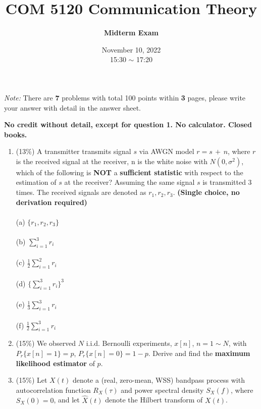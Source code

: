 \documentclass[a4paper,12pt]{article}
\title{\textbf{COM 5120 Communication Theory}}
\author{\textbf{Midterm Exam}}
\date{November 10, 2022 \\ 
15:30 $\sim$ 17:20
}
\begin{document}
    \maketitle
    \textit{Note: }There are \textbf{7} problems with total 100 points within \textbf{3} pages, please write your answer with detail in the answer sheet.

    {\bf No credit without detail, except for question 1.  No calculator. Closed books.}

    \begin{enumerate}
        \item (13\%) 
            A transmitter transmits signal $s$ via AWGN model $r = s \,+\,n$, where $r$ is the received signal at the receiver, n is the white noise with $N(0, \sigma^2)$, which of the following is \textbf{NOT} a \textbf{sufficient statistic} with respect to the estimation of $s$ at the receiver? Assuming the same signal $s$ is transmitted 3 times. The received signals are denoted as $r_1, r_2, r_3.$ 
            {\bf (Single choice, no derivation required)} 
            \\ \\
            (a) $\{r_1, r_2, r_3\}$ \\ \\
            (b) $ \sum_{i=1}^{3} r_i $ \\ \\
            (c) $ \frac{1}{2} \sum_{i=1}^{2} r_i $ \\ \\
            (d) $\{ \sum_{i=1}^{3} r_i \}^3$ \\ \\
            (e) $ \frac{1}{3} \sum_{i=1}^{3} r_i $ \\ \\
            (f) $ \frac{1}{2} \sum_{i=1}^{3} r_i $ \\
        \item (15\%) 
            We observed $N$ i.i.d. Bernoulli experiments, $x[n]$, $n = 1 \sim N$, with $P_r\{x[n] = 1\} = p$, $P_r\{x[n] = 0\} = 1 - p$. Derive and find the \textbf{maximum likelihood estimator} of $p$.  \\
        \item(15\%) 
            Let $X(t)$ denote a (real, zero-mean, WSS) bandpass process with autocorrelation function $R_X(\tau)$ and power spectral density $S_X(f)$, where $S_X(0) = 0$, and let $\hat{X}(t)$ denote the Hilbert transform of $X(t)$. 

\end{enumerate}
\end{document}
